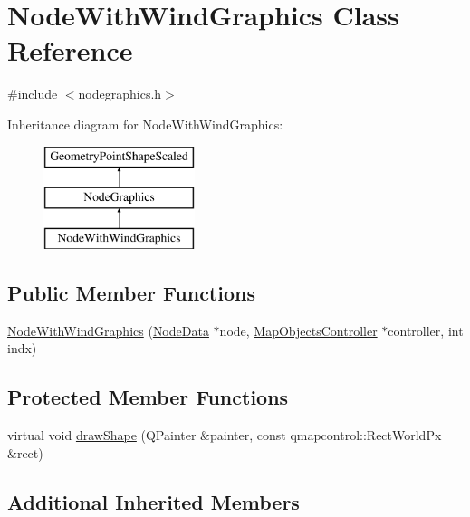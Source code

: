 \hypertarget{class_node_with_wind_graphics}{}\section{Node\+With\+Wind\+Graphics Class Reference}
\label{class_node_with_wind_graphics}


{\ttfamily \#include $<$nodegraphics.\+h$>$}

Inheritance diagram for Node\+With\+Wind\+Graphics\+:\begin{figure}[H]
\begin{center}
\leavevmode
\includegraphics[height=3.000000cm]{dc/df7/class_node_with_wind_graphics}
\end{center}
\end{figure}
\subsection*{Public Member Functions}
\begin{DoxyCompactItemize}
\item 
\mbox{\hyperlink{class_node_with_wind_graphics_a39474f9538043c68234898723588e45a}{Node\+With\+Wind\+Graphics}} (\mbox{\hyperlink{class_node_data}{Node\+Data}} $\ast$node, \mbox{\hyperlink{class_map_objects_controller}{Map\+Objects\+Controller}} $\ast$controller, int indx)
\end{DoxyCompactItemize}
\subsection*{Protected Member Functions}
\begin{DoxyCompactItemize}
\item 
virtual void \mbox{\hyperlink{class_node_with_wind_graphics_ada3f64e69262f7bb5a9e6f6c943b016c}{draw\+Shape}} (Q\+Painter \&painter, const qmapcontrol\+::\+Rect\+World\+Px \&rect)
\end{DoxyCompactItemize}
\subsection*{Additional Inherited Members}


